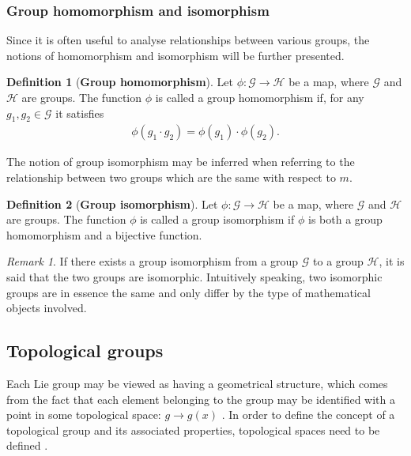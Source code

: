 \documentclass[12pt,a4paper]{report}
\theoremstyle{definition}
\newtheorem{definition}{Definition}
\theoremstyle{remark}
\newtheorem*{remark}{Remark}
\theoremstyle{remark}
\begin{document}
\subsubsection{Group homomorphism and isomorphism}
Since it is often useful to analyse relationships between various groups, the notions of homomorphism and isomorphism will be further presented.
\begin{definition}[\textbf{Group homomorphism}]
Let $\phi:\mathcal{G}\rightarrow\mathcal{H}$ be a map, where $\mathcal{G}$ and $\mathcal{H}$ are groups. The function $\phi$ is called a group homomorphism if, for any $g_1,g_2\in\mathcal{G}$ it satisfies
\begin{align*}
\phi(g_1\cdot g_2)=\phi(g_1)\cdot \phi(g_2).
\end{align*}
\end{definition}
The notion of group isomorphism may be inferred when referring to the relationship between two groups which are the same with respect to $m$.
\begin{definition}[\textbf{Group isomorphism}]
Let $\phi:\mathcal{G}\rightarrow\mathcal{H}$ be a map, where $\mathcal{G}$ and $\mathcal{H}$ are groups. The function $\phi$ is called a group isomorphism if $\phi$ is both a group homomorphism and a bijective function. 
\end{definition}
\begin{remark}
If there exists a group isomorphism from a group $\mathcal{G}$ to a group $\mathcal{H}$, it is said that the two groups are isomorphic. Intuitively speaking, two isomorphic groups are in essence the same and only differ by the type of mathematical objects involved.
\end{remark}


\subsection{Topological groups}
Each Lie group may be viewed as having a geometrical structure, which comes from the fact that each element belonging to the group may be identified with a point in some topological space: $g\rightarrow g(x)$ \cite{gilmore}. In order to define the concept of a topological group and its associated properties, topological spaces need to be defined \cite{barutrackza}.
\end{document}
